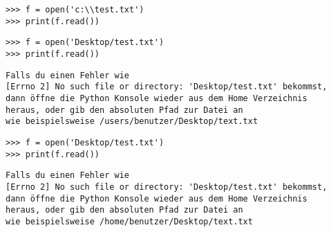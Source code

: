 \begin{WINDOWS}

\begin{Verbatim}[frame=single]
>>> f = open('c:\\test.txt')
>>> print(f.read())
\end{Verbatim}

\end{WINDOWS}

\begin{MAC}

\begin{Verbatim}[frame=single]
>>> f = open('Desktop/test.txt')
>>> print(f.read())
\end{Verbatim}

\begin{Verbatim}[frame=single, label=eventueller Fehler]
Falls du einen Fehler wie 
[Errno 2] No such file or directory: 'Desktop/test.txt' bekommst, 
dann öffne die Python Konsole wieder aus dem Home Verzeichnis 
heraus, oder gib den absoluten Pfad zur Datei an 
wie beispielsweise /users/benutzer/Desktop/text.txt
\end{Verbatim}

\end{MAC}

\begin{LINUX}

\begin{Verbatim}[frame=single]
>>> f = open('Desktop/test.txt')
>>> print(f.read())
\end{Verbatim}

\begin{Verbatim}[frame=single, label=eventueller Fehler]
Falls du einen Fehler wie 
[Errno 2] No such file or directory: 'Desktop/test.txt' bekommst, 
dann öffne die Python Konsole wieder aus dem Home Verzeichnis 
heraus, oder gib den absoluten Pfad zur Datei an 
wie beispielsweise /home/benutzer/Desktop/text.txt
\end{Verbatim}

\end{LINUX}

